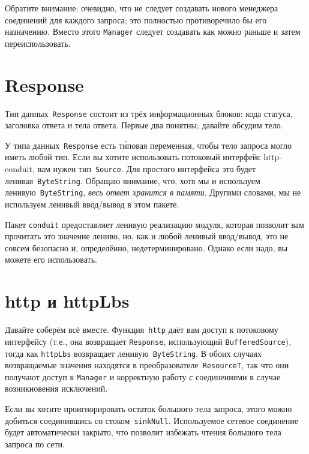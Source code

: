 Обратите внимание: очевидно, что не следует создавать нового
менеджера соединений для каждого запроса; это полностью противоречило бы
его назначению. Вместо этого \lstinline!Manager! следует создавать как можно
раньше и затем переиспользовать.

\section{Response}
Тип данных~\lstinline!Response! состоит из трёх информационных блоков:
кода статуса, заголовка ответа и тела ответа. Первые два понятны;
давайте обсудим тело.

У типа данных~\lstinline!Response! есть т\'иповая переменная, чтобы 
тело запроса могло иметь любой тип. Если вы хотите
использовать потоковый интерфейс http-conduit, вам нужен
тип~\lstinline!Source!. Для простого интерфейса это будет
ленивая~\lstinline!ByteString!. Обращаю внимание, что, хотя мы и
используем ленивую~\lstinline!ByteString!, \emph{весь ответ хранится в
памяти}. Другими словами, мы не используем ленивый ввод/вывод в этом
пакете.

\begin{remark}
Пакет \texttt{conduit} предоставляет ленивую реализацию модуля, которая
позволит вам прочитать это значение лениво, но, как и любой ленивый
ввод/вывод, это не совсем безопасно и, определённо, недетерминировано.
Однако если надо, вы можете его использовать.
\end{remark}

\section{http и httpLbs}
Давайте соберём всё вместе. Функция~\lstinline!http! даёт вам доступ к
потоковому интерфейсу (т.е., она возвращает \lstinline!Response!,
использующий \lstinline!BufferedSource!), тогда как
\lstinline!httpLbs! возвращает ленивую~\lstinline!ByteString!.
В обоих случаях возвращаемые значения находятся в
преобразователе~\lstinline!ResourceT!, так что они
получают доступ к \lstinline!Manager! и корректную работу с соединениями в
случае возникновения исключений.

\begin{remark}
Если вы хотите проигнорировать остаток большого тела запроса, этого можно добиться
соединившись со стоком~\lstinline!sinkNull!. Используемое сетевое
соединение будет автоматически закрыто, что позволит избежать
чтения большого тела запроса по сети.
\end{remark}
